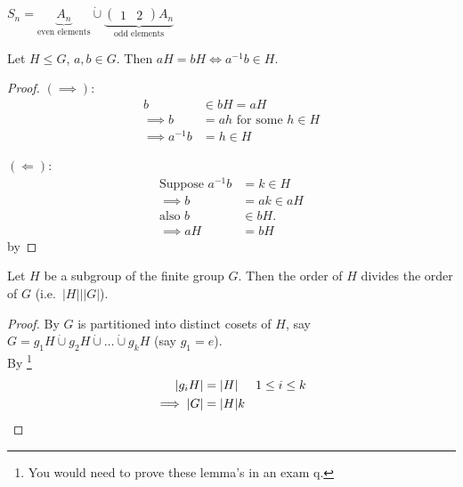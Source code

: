 \begin{example}
\(S_n = \underbrace{A_n}_\text{even elements} \mathbin{\dot{\cup}} \underbrace{\begin{pmatrix}1 & 2\end{pmatrix} A_n}_\text{odd elements}\)
\end{example}

\begin{lemma}
\protect\hypertarget{lem:eleven}{}\label{lem:eleven}
Let \(H \leq G\), \(a, b \in G\).
Then \(aH = bH \iff a^{-1} b \in H\).
\end{lemma}

\begin{proof}
\((\implies)\):
\begin{align*}
    b &\in bH = aH \\
    \implies b &= ah \text{ for some } h \in H \\
    \implies a^{-1} b &= h \in H
\end{align*}

\((\Longleftarrow)\):
\begin{align*}
    \text{Suppose } a^{-1}b &= k \in H \\
    \implies b &= ak \in aH \\
    \text{also } b &\in bH. \\
    \implies aH &= bH
\end{align*} by 
\end{proof}

\begin{theorem}
\protect\hypertarget{thm:three}{}\label{thm:three}
Let \(H\) be a subgroup of the finite group \(G\).
Then the order of \(H\) divides the order of \(G\) (i.e.~\(|H| \bigg| |G|\)).
\end{theorem}

\begin{proof}
By  \(G\) is partitioned into distinct cosets of \(H\), say \(G = g_1 H \mathbin{\dot{\cup}} g_2 H \mathbin{\dot{\cup}} \ldots \mathbin{\dot{\cup}} g_k H\) (say \(g_1 = e\)).\\
By \footnote{You would need to prove these lemma's in an exam q.}
\begin{align*}
    |g_i H| &= |H| \hspace{.5cm} 1 \leq i \leq k \\
    \implies |G| &= |H|k
\end{align*}
\end{proof}

